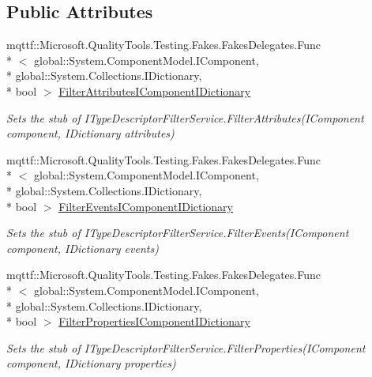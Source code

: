 \subsection*{Public Attributes}
\begin{DoxyCompactItemize}
\item 
mqttf\-::\-Microsoft.\-Quality\-Tools.\-Testing.\-Fakes.\-Fakes\-Delegates.\-Func\\*
$<$ global\-::\-System.\-Component\-Model.\-I\-Component, \\*
global\-::\-System.\-Collections.\-I\-Dictionary, \\*
bool $>$ \hyperlink{class_system_1_1_component_model_1_1_design_1_1_fakes_1_1_stub_i_type_descriptor_filter_service_ad4b91d84616520e159beb7b4aa13b9ea}{Filter\-Attributes\-I\-Component\-I\-Dictionary}
\begin{DoxyCompactList}\small\item\em Sets the stub of I\-Type\-Descriptor\-Filter\-Service.\-Filter\-Attributes(\-I\-Component component, I\-Dictionary attributes)\end{DoxyCompactList}\item 
mqttf\-::\-Microsoft.\-Quality\-Tools.\-Testing.\-Fakes.\-Fakes\-Delegates.\-Func\\*
$<$ global\-::\-System.\-Component\-Model.\-I\-Component, \\*
global\-::\-System.\-Collections.\-I\-Dictionary, \\*
bool $>$ \hyperlink{class_system_1_1_component_model_1_1_design_1_1_fakes_1_1_stub_i_type_descriptor_filter_service_af873aebaa5537559835b92ab46092a71}{Filter\-Events\-I\-Component\-I\-Dictionary}
\begin{DoxyCompactList}\small\item\em Sets the stub of I\-Type\-Descriptor\-Filter\-Service.\-Filter\-Events(\-I\-Component component, I\-Dictionary events)\end{DoxyCompactList}\item 
mqttf\-::\-Microsoft.\-Quality\-Tools.\-Testing.\-Fakes.\-Fakes\-Delegates.\-Func\\*
$<$ global\-::\-System.\-Component\-Model.\-I\-Component, \\*
global\-::\-System.\-Collections.\-I\-Dictionary, \\*
bool $>$ \hyperlink{class_system_1_1_component_model_1_1_design_1_1_fakes_1_1_stub_i_type_descriptor_filter_service_ae7fb0adf359012daf2b1fe3def0741a5}{Filter\-Properties\-I\-Component\-I\-Dictionary}
\begin{DoxyCompactList}\small\item\em Sets the stub of I\-Type\-Descriptor\-Filter\-Service.\-Filter\-Properties(\-I\-Component component, I\-Dictionary properties)\end{DoxyCompactList}\end{DoxyCompactItemize}


